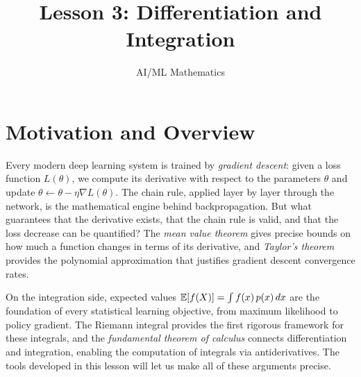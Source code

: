 \documentclass[11pt,a4paper]{article}
\title{Lesson 3: Differentiation and Integration}
\author{AI/ML Mathematics}
\date{}
\begin{document}
\maketitle
\tableofcontents
\newpage

\section{Motivation and Overview}
\label{sec:motivation}

Every modern deep learning system is trained by \emph{gradient descent}:
given a loss function $L(\theta)$, we compute its derivative with respect
to the parameters $\theta$ and update $\theta \leftarrow \theta -
\eta \nabla L(\theta)$. The chain rule, applied layer by layer through
the network, is the mathematical engine behind backpropagation. But what
guarantees that the derivative exists, that the chain rule is valid, and
that the loss decrease can be quantified? The \emph{mean value theorem}
gives precise bounds on how much a function changes in terms of its
derivative, and \emph{Taylor's theorem} provides the polynomial
approximation that justifies gradient descent convergence rates.

On the integration side, expected values $\mathbb{E}[f(X)] = \int f(x)\, p(x)
\,dx$ are the foundation of every statistical learning objective, from
maximum likelihood to policy gradient. The Riemann integral provides the
first rigorous framework for these integrals, and the \emph{fundamental
theorem of calculus} connects differentiation and integration, enabling
the computation of integrals via antiderivatives. The tools developed in
this lesson will let us make all of these arguments precise.
\end{document}
